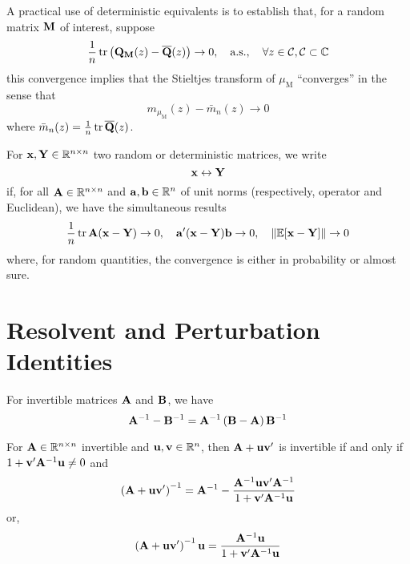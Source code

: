 \begin{remark}
	A practical use of deterministic equivalents is to establish that, for a random matrix \(\mathbf{M}\) of interest, suppose
	\begin{equation*}
		\frac{1}{n}\operatorname{tr}\left(\mathbf{Q}_{\mathbf{M}}(z)-\overline{\mathbf{Q}}(z)\right)\rightarrow 0,\quad\text{a.s.},\quad\forall z\in\mathcal{C} ,\mathcal{C}\subset\mathbb{C}
	\end{equation*}
	this convergence implies that the Stieltjes transform of \(\mu_{\mathrm{M}}\) ``converges'' in the sense that
	\begin{equation*}
		m_{\mu_{\mathrm{M}}}(z)-\bar{m}_{n}(z)\rightarrow 0
	\end{equation*}
	where \(\bar{m}_{n}(z)=\frac{1}{n}\operatorname{tr}\overline{\mathbf{Q}}(z)\).
\end{remark}

\begin{definition}
	For \(\mathbf{x},\mathbf{Y}\in\mathbb{R}^{n \times n}\) two random or deterministic matrices, we write
	\begin{equation}
		\mathbf{x}\leftrightarrow\mathbf{Y}
	\end{equation}
	if, for all \(\mathbf{A}\in\mathbb{R}^{n\times n}\) and \(\mathbf{a},\mathbf{b}\in\mathbb{R}^{n}\) of unit norms (respectively, operator and Euclidean), we have the simultaneous results
	\begin{equation*}
		\frac{1}{n}\operatorname{tr}\mathbf{A}(\mathbf{x}-\mathbf{Y})\rightarrow 0,\quad \mathbf{a}^{\prime}(\mathbf{x}-\mathbf{Y})\mathbf{b}\rightarrow 0,\quad\|\mathbb{E}[\mathbf{x}-\mathbf{Y}]\|\rightarrow 0
	\end{equation*}
	where, for random quantities, the convergence is either in probability or almost sure.
\end{definition}

\section{Resolvent and Perturbation Identities}

\begin{lemma}\label{lem:resolvent-identity}
	For invertible matrices \(\mathbf{A}\) and \(\mathbf{B}\), we have
	\begin{equation}
		\mathbf{A}^{-1}-\mathbf{B}^{-1}=\mathbf{A}^{-1}\left(\mathbf{B}-\mathbf{A}\right)\mathbf{B}^{-1}
	\end{equation}
\end{lemma}

\begin{lemma}\label{lem:sherman-morrison}
	For \(\mathbf{A}\in\mathbb{R}^{n\times n}\) invertible and \(\mathbf{u},\mathbf{v}\in\mathbb{R}^{n}\), then \(\mathbf{A}+\mathbf{u}\mathbf{v}^{\prime}\) is invertible if and only if \(1+\mathbf{v}^{\prime}\mathbf{A}^{-1}\mathbf{u}\neq 0\) and
	\begin{equation}
		\left(\mathbf{A}+\mathbf{u}\mathbf{v}^{\prime}\right)^{-1}=\mathbf{A}^{-1}-\frac{\mathbf{A}^{-1}\mathbf{u}\mathbf{v}^{\prime}\mathbf{A}^{-1}}{1+\mathbf{v}^{\prime}\mathbf{A}^{-1}\mathbf{u}}
	\end{equation}
	or,
	\begin{equation}
		\left(\mathbf{A}+\mathbf{u}\mathbf{v}^{\prime}\right)^{-1}\mathbf{u}=\frac{\mathbf{A}^{-1}\mathbf{u}}{1+\mathbf{v}^{\prime}\mathbf{A}^{-1}\mathbf{u}}
	\end{equation}
\end{lemma}

